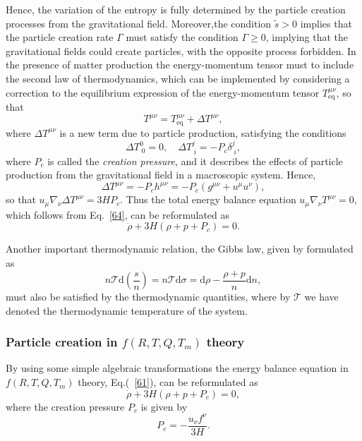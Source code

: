 \documentclass[aps,superscriptaddress, showpacs,preprintnumbers, superscriptaddress, nofootinbibt,twocolumn]{revtex4}
\def\be{\begin{equation}}
\def\ee{\end{equation}}
\begin{document}
Hence, the variation of the entropy is fully determined by the particle creation processes from the gravitational field. Moreover,the condition  $\tilde{s}>0$ implies that the particle creation rate $\Gamma$ must satisfy the condition $\Gamma \geq 0$, implying that the gravitational fields could create particles, with the opposite process forbidden.  In the presence of matter production the
energy-momentum tensor must to include the second law of thermodynamics, which can be implemented by considering a correction to the equilibrium expression of the energy-momentum tensor $T^{\mu \nu}_{\text{eq}}$, so that \cite{Bar}
\begin{equation}\label{64}
T^{\mu \nu}=T^{\mu \nu}_\text{eq}+\Delta T^{\mu \nu},
\end{equation}
where $\Delta T^{\mu \nu}$ is a new term due to
particle production, satisfying the conditions
\begin{equation}
\Delta T_{\; 0}^0=0, \quad \Delta T_{\; i}^j=-P_c\delta_{\; i}^j,
\end{equation}
where $P_c$ is called the \textit{creation pressure}, and it describes
the  effects of particle production from the gravitational field in a
macroscopic system. Hence,
\begin{equation}
\Delta T^{\mu \nu}=-P_ch^{\mu \nu}=-P_c\left(g^{\mu \nu}+u^{\mu}u^{\nu}\right),
\end{equation}
so that $u_{\mu}\nabla _{\nu}\Delta T^{\mu \nu}=3HP_c$.
Thus the total energy balance
equation $u_{\mu}\nabla _{\nu}T^{\mu \nu}=0$, which follows from Eq.~\eqref{64}, can be reformulated as
\begin{equation}
\dot{\rho}+3H\left(\rho+p+P_c\right)=0.
\end{equation}

Another important thermodynamic relation, the Gibbs law, given by
formulated as \cite{Lima}
\begin{equation}
n \mathcal{T} \mathrm{d} \left(\frac{s}{n}\right)=n\mathcal{T}\mathrm{d}\sigma=\mathrm{d}\rho -\frac{\rho+p}{n}\mathrm{d}n,
\end{equation}
must also be satisfied by the thermodynamic quantities, where by $\mathcal{T}$ we have denoted the thermodynamic temperature of the system.

\subsubsection{Particle creation in $f\left(R,T,Q,T_m\right)$ theory}

By using some simple algebraic transformations the energy balance equation in $f\left(R,T,Q,T_m\right)$ theory, Eq.(~\eqref{61}), can be reformulated as
\begin{equation}\label{76}
\dot{\rho}+3H\left( \rho +p+P_{c}\right) =0,
\end{equation}%
where the creation pressure $P_{c}$ is given by
\be
P_c=-\frac{u_{\nu}f^{\nu}}{3H}.
\ee
\end{document}
